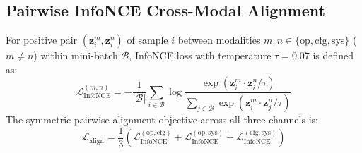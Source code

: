 \documentclass[pdflatex,sn-mathphys-num]{sn-jnl}
\begin{document}
\subsection{Pairwise InfoNCE Cross-Modal Alignment}\label{sec:math_infonce}
For positive pair $(\mathbf{z}_i^m, \mathbf{z}_i^n)$ of sample $i$ between modalities $m, n \in \{\text{op}, \text{cfg}, \text{sys}\}$ ($m \neq n$) within mini-batch $\mathcal{B}$, InfoNCE loss with temperature $\tau = 0.07$ is defined as:
\begin{equation}
\mathcal{L}_{\text{InfoNCE}}^{(m, n)} = -\frac{1}{|\mathcal{B}|} \sum_{i \in \mathcal{B}} \log \frac{\exp\left(\mathbf{z}_i^m \cdot \mathbf{z}_i^n / \tau\right)}{\sum_{j \in \mathcal{B}} \exp\left(\mathbf{z}_i^m \cdot \mathbf{z}_j^n / \tau\right)}
\end{equation}
The symmetric pairwise alignment objective across all three channels is:
\begin{equation}
\mathcal{L}_{\text{align}} = \frac{1}{3}\left(\mathcal{L}_{\text{InfoNCE}}^{(\text{op}, \text{cfg})} + \mathcal{L}_{\text{InfoNCE}}^{(\text{op}, \text{sys})} + \mathcal{L}_{\text{InfoNCE}}^{(\text{cfg}, \text{sys})}\right)
\end{equation}
\end{document}
